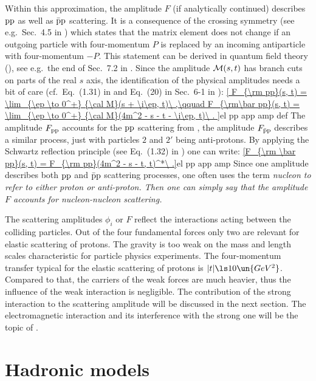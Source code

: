 Within this approximation, the amplitude $F$ (if analytically continued) describes $\rm pp$ as well as $\rm \bar pp$ scattering. It is a consequence of the crossing symmetry (see e.g.~Sec.~4.5 in ) which states that the matrix element does not change if an outgoing particle with four-momentum $P$ is replaced by an incoming antiparticle with four-momentum $-P$. This statement can be derived in quantum field theory (), see e.g.~the end of Sec.~7.2 in . Since the  amplitude ${\cal M}(s, t)$ has branch cuts on parts of the real $s$ axis, the identification of the physical amplitudes needs a bit of care (cf.~Eq.~(1.31) in  and Eq.~(20) in Sec.~6-1 in ):
\eqref{
	F_{\rm pp}(s, t) = \lim_{\ep \to 0^+} {\cal M}(s + \i\ep, t)\ ,\qquad
	F_{\rm\bar pp}(s, t) = \lim_{\ep \to 0^+} {\cal M}(4m^2 - s - t - \i\ep, t)\ .
}{el pp app amp def}
The amplitude $F_{\rm pp}$ accounts for the $\rm pp$ scattering from , the amplitude $F_{\rm\bar pp}$ describes a similar process, just with particles $2$ and $2'$ being anti-protons. By applying the Schwartz reflection principle (see Eq.~(1.32) in ) one can write:
\eqref{F_{\rm \bar pp}(s, t) = F_{\rm pp}(4m^2 - s - t, t)^*\ .}{el pp app amp}
Since one amplitude describes both $\rm pp$ and $\rm\bar pp$ scattering processes, one often uses the term \em{nucleon} to refer to either proton or anti-proton. Then one can simply say that the amplitude $F$ accounts for nucleon-nucleon scattering.

The scattering amplitudes $\phi_i$ or $F$ reflect the interactions acting between the colliding particles. Out of the four fundamental forces only two are relevant for elastic scattering of protons. The gravity is too weak on the mass and length scales characteristic for particle physics experiments. The four-momentum transfer typical for the elastic scattering of protons is $|t| \ls 10\un{GeV^2}$. Compared to that, the carriers of the weak forces are much heavier, thus the influence of the weak interaction is negligible. The contribution of the strong interaction to the scattering amplitude will be discussed in the next section. The electromagnetic interaction and its interference with the strong one will be the topic of .

\section[el models]{Hadronic models}

